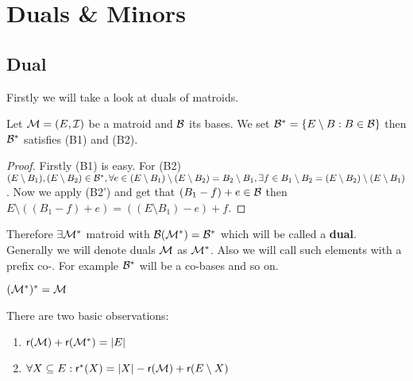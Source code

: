\chapter{Duals \& Minors}

\section{Dual}

Firstly we will take a look at duals of matroids.

\begin{claim}
	Let $\mathcal{M} = (E, \mathcal{I})$ be a matroid and $\mathcal{B}$ its bases. We set $\mathcal{B}^{\ast} = \{E \setminus B : B \in \mathcal{B}\}$ then $\mathcal{B}^{\ast}$ satisfies (B1) and (B2).
\end{claim}

\begin{proof}
	Firstly (B1) is easy. For (B2) $(E \setminus B_1), (E \setminus B_2) \in \mathcal{B}^{\ast}, \forall e \in (E \setminus B_1) \setminus (E \setminus B_2) = B_2 \setminus B_1, \exists f \in B_1 \setminus B_2 = (E \setminus B_2) \setminus (E \setminus B_1)$. Now we apply (B2') and get that $(B_1 - f) + e \in \mathcal{B}$ then $E \setminus ((B_1 -f) +e) =((E \setminus B_1) -e ) + f$.
\end{proof}

Therefore $\exists \mathcal{M}^{\ast}$ matroid with $\mathcal{B}(\mathcal{M}^{\ast}) = \mathcal{B}^{\ast}$ which will be called a \textbf{dual}. Generally we will denote duals $\mathcal{M}$ as $\mathcal{M}^{\ast}$. Also we will call such elements with a prefix co-. For example $\mathcal{B}^{\ast}$ will be a co-bases and so on.

\begin{observ}
	$(\mathcal{M}^{\ast})^{\ast} = \mathcal{M}$
\end{observ}

\begin{prop}
	There are two basic observations:
	
	\begin{enumerate}
		\item $\operatorname{\textsf{r}}(\mathcal{M}) + \operatorname{\textsf{r}}(\mathcal{M}^{\ast}) = |E|$
		\item $\forall X \subseteq E : \operatorname{\textsf{r}}^{\ast}(X) = |X| - \operatorname{\textsf{r}}(\mathcal{M}) + \operatorname{\textsf{r}}(E \setminus X)$
	\end{enumerate}
	\label{rank-prop}
\end{prop}

